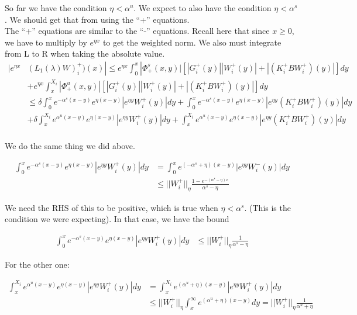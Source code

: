 \documentclass[12pt]{article}
\begin{document}
So far we have the condition $\eta < \alpha^u$. We expect to also have the condition $\eta < \alpha^s$. We should get that from using the ``+'' equations.\\

The ``+'' equations are similar to the ``-'' equations. Recall here that since $x \geq 0$, we have to multiply by $e^{\eta x}$ to get the weighted norm. We also must integrate from L to R when taking the absolute value.\\

\begin{align*}
|e^{\eta x} & (L_1(\lambda)W)_i^+)(x) | \leq e^{\eta x} \int_0^x |\Phi^s_+(x, y)|[|G_i^+(y)||W_i^+(y)| + |(K_i^+ B W_i^+)(y)| ] dy \\
&+ e^{\eta x} \int_x^{X_i} |\Phi^u_+(x, y)|[|G_i^+(y)||W_i^+(y)| + |(K_i^+ B W_i^+)(y)| ] dy \\
&\leq \delta \int_0^x e^{-\alpha^s (x-y)}e^{\eta(x-y)}|e^{\eta y} W_i^+(y)| dy 
+ \int_0^x e^{-\alpha^s (x-y)}e^{\eta(x-y)}|e^{\eta y} (K_i^+ B W_i^+)(y)| dy \\
&+ \delta \int_x^{X_i} e^{\alpha^u (x-y)}e^{\eta(x-y)}|e^{\eta y} W_i^+(y)| dy 
+ \int_x^{X_i} e^{\alpha^u (x-y)}e^{\eta(x-y)}|e^{\eta y} (K_i^+ B W_i^+)(y)| dy \\ 
\end{align*}

We do the same thing we did above.

\begin{align*}
\int_0^x e^{-\alpha^s (x-y)}e^{\eta(x-y)}|e^{\eta y} W_i^+(y)| dy &= \int_0^x e^{(-\alpha^s + \eta) (x-y)}|e^{\eta y} W_i^-(y)| dy \\
&\leq ||W_i^+||_\eta \frac{1 - e^{-(\alpha^s - \eta)x} }{\alpha^s - \eta}
\end{align*}

We need the RHS of this to be positive, which is true when $\eta < \alpha^s$. (This is the condition we were expecting). In that case, we have the bound

\begin{align*}
\int_0^x e^{-\alpha^s (x-y)}e^{\eta(x-y)}|e^{\eta y} W_i^+(y)| dy &\leq ||W_i^+||_\eta \frac{1}{\alpha^s - \eta}
\end{align*}

For the other one:

\begin{align*}
\int_x^{X_i} e^{\alpha^u (x-y)}e^{\eta(x-y)}|e^{\eta y} W_i^+(y)| dy &= \int_x^{X_i} e^{(\alpha^u + \eta) (x-y)}|e^{\eta y} W_i^+(y)| dy \\
&\leq ||W_i^+||_\eta \int_x^{\infty} e^{(\alpha^u + \eta) (x-y)} dy = ||W_i^+||_\eta \frac{1}{\alpha^u + \eta}
\end{align*}
\end{document}
